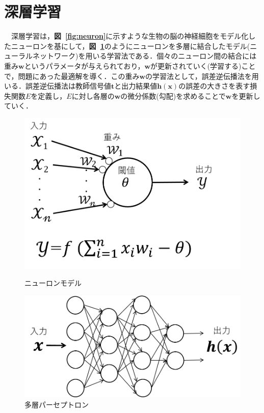 \documentclass[a4j, 11pt]{jreport}
\newcommand{\figref}[1]{\textbf{図~\ref{#1}}}
\begin{document}
\section{深層学習}
　深層学習は，\figref{fig:neuron}に示すような生物の脳の神経細胞をモデル化したニューロンを基にして，\figref{fig:tasou}のようにニューロンを多層に結合したモデル(ニューラルネットワーク)を用いる学習法である．個々のニューロン間の結合には重み$\bm{w}$というパラメータが与えられており，$\bm{w}$が更新されていく(学習する)ことで，問題にあった最適解を導く．この重み$\bm{w}$の学習法として，誤差逆伝播法を用いる．誤差逆伝播法は教師信号値$\bm{t}$と出力結果値$\bm{h(x)}$の誤差の大きさを表す損失関数$E$を定義し，$E$に対し各層の$\bm{w}$の微分係数(勾配)を求めることで$\bm{w}$を更新していく．\\
\begin{figure}[htbp]
	\begin{minipage}{0.5\hsize}
		\begin{center}
			\includegraphics[scale=0.5]{./images/deeplearning/neuron_model.png}
			\caption{ニューロンモデル \label{fig:neuron}}
			
		\end{center}
	\end{minipage}
	\begin{minipage}{0.5\hsize}
		\begin{center}
			\includegraphics[scale=0.5]{./images/deeplearning/tasou.png}
			\caption{多層パーセプトロン \label{fig:tasou}}
			
		\end{center}
	\end{minipage}
\end{figure}
\end{document}
